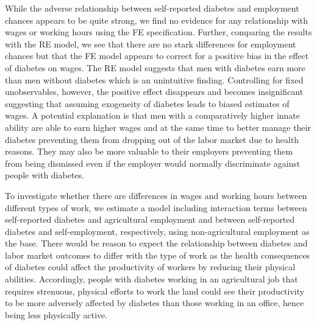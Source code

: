 \documentclass[12pt,english,british]{article}
\begin{document}
While the adverse relationship between self-reported diabetes and
employment chances appears to be quite strong, we find no evidence
for any relationship with wages or working hours using the \ac{FE} specification. Further, comparing the results with the \ac{RE} model, we see that there are no stark differences for employment chances but that the \ac{FE} model appears to correct for a positive bias in the effect of diabetes on wages. The \ac{RE} model suggests that men with diabetes earn more than men without diabetes which is an unintuitive finding. Controlling for fixed unobservables, however, the positive effect disappears and becomes insignificant suggesting that assuming exogeneity of diabetes leads to biased estimates of wages. A potential explanation is that men with a comparatively higher innate ability are able to earn higher wages and at the same time to better manage their diabetes preventing them from dropping out of the labor market due to health reasons. They may also be more valuable to their employers preventing them from being dismissed even if the employer would normally discriminate against people with diabetes.

To investigate whether there are differences in
wages and working hours between different types of work, we estimate
a model including interaction terms between self-reported diabetes
and agricultural employment and between self-reported diabetes and
self-employment, respectively, using non-agricultural employment as
the base. There would be reason to expect the relationship between
diabetes and labor market outcomes to differ with the type of work as
the health consequences of diabetes could affect the productivity
of workers by reducing their physical abilities. Accordingly, people
with diabetes working in an agricultural job that requires strenuous,
physical efforts to work the land could see their productivity to be
more adversely affected by diabetes than those working in an office,
hence being less physically active. 
\end{document}
